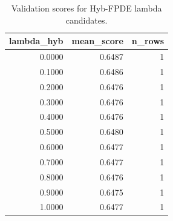 \begin{table}[t]
\caption{Validation scores for Hyb-FPDE lambda candidates.}
\label{tab:lambda_distribution_computed}
\centering
\begin{tabular}{rrr}
\toprule
lambda\_hyb & mean\_score & n\_rows \\
\midrule
0.0000 & 0.6487 & 1 \\
0.1000 & 0.6486 & 1 \\
0.2000 & 0.6476 & 1 \\
0.3000 & 0.6476 & 1 \\
0.4000 & 0.6476 & 1 \\
0.5000 & 0.6480 & 1 \\
0.6000 & 0.6477 & 1 \\
0.7000 & 0.6477 & 1 \\
0.8000 & 0.6476 & 1 \\
0.9000 & 0.6475 & 1 \\
1.0000 & 0.6477 & 1 \\
\bottomrule
\end{tabular}

\end{table}
